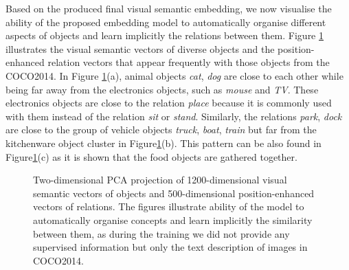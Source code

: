 \documentclass[11pt]{article}
\begin{document}
Based on the produced final visual semantic embedding, we now visualise the ability of the proposed embedding model to automatically organise different aspects of objects and learn implicitly the relations between them. Figure \ref{fig:embed_plot} illustrates the visual semantic vectors of diverse objects and the position-enhanced relation vectors that appear frequently with those objects from the COCO2014. In Figure \ref{fig:embed_plot}(a), animal objects \textit{cat}, \textit{dog} are close to each other while being far away from the electronics objects, such as \textit{mouse} and \textit{TV}. These electronics objects are close to the relation \textit{place} because it is commonly used with them instead of the relation \textit{sit} or \textit{stand}. Similarly, the relations \textit{park}, \textit{dock} are close to the group of vehicle objects \textit{truck}, \textit{boat}, \textit{train} but far from the kitchenware object cluster in Figure\ref{fig:embed_plot}(b). This pattern can be also found in Figure\ref{fig:embed_plot}(c) as it is shown that the food objects are gathered together.




\begin{figure}[t]
\centering
{}
\label{fig:subfig2}

\label{fig:subfig3}

\caption[]{Two-dimensional PCA projection of 1200-dimensional visual semantic vectors of objects and 500-dimensional position-enhanced vectors of relations. The figures illustrate ability of the model to automatically organise concepts and learn implicitly the similarity between them, as during the training we did not provide any supervised information but only the text description of images in COCO2014.}
\label{fig:embed_plot}
\end{figure}
\end{document}
